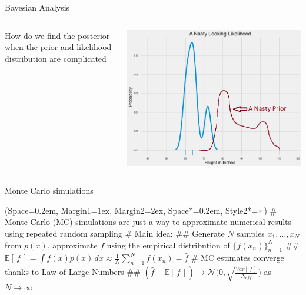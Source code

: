\documentclass[12pt, aspectratio=149]{beamer}
\newcommand{\listSpace}{0.2em}
\theoremstyle{plain}
\begin{document}
\begin{frame}{Bayesian Analysis}
\begin{columns}
\begin{column}{0.5\linewidth}
How do we find the posterior when the prior and likelihood distribution are complicated
\end{column}
\begin{column}{0.5\linewidth}
\includegraphics[scale=0.2]{figs/nasty_prior_posterior_example.png}
\end{column}
\end{columns}
\end{frame}

\begin{frame}[fragile]{Monte Carlo simulations}
	\begin{easylist}
		\ListProperties(Space=\listSpace, Margin1=1ex, Margin2=2ex, Space*=\listSpace, Style2*=$\color{bggraydark}\blacktriangleright$\space)
		# Monte Carlo (MC) simulations are just a way to approximate numerical results using repeated random sampling
		# Main idea:
		## Generate $N$ samples $x_1, \ldots, x_N$ from $p(x)$, approximate $f$ using the empirical distribution of $\{f(x_n)\}_{n=1}^N$
		## $\mathbb{E}\left[ \, f \, \right] = \int f(x)p(x) \,dx \approx \frac{1}{N} \sum_{n=1}^{N} f(x_n) = \hat{f}$ 
		# MC estimates converge thanks to Law of Large Numbers
		## $(\hat{f} - \mathbb{E}\left[ \, f \, \right]) \rightarrow \mathcal{N}\Big(0, \sqrt{\frac{Var\left[\,f\,\right]}{N_{eff}}}\Big)$ as $N \rightarrow \infty$
	\end{easylist}
\end{frame}
\end{document}
